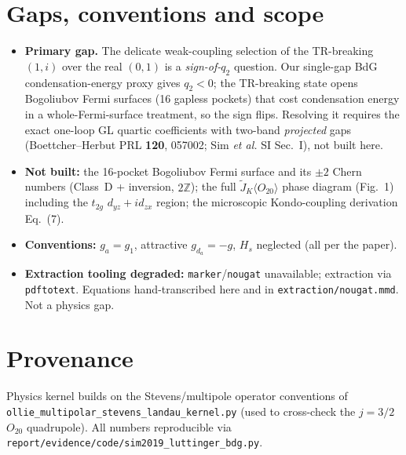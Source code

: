 \documentclass[11pt]{article}
\begin{document}
\section{Gaps, conventions and scope}
\begin{itemize}
\item \textbf{Primary gap.} The delicate weak-coupling selection of the TR-breaking $(1,i)$ over the
real $(0,1)$ is a \emph{sign-of-}$q_2$ question. Our single-gap BdG condensation-energy proxy gives
$q_2<0$; the TR-breaking state opens Bogoliubov Fermi surfaces (16 gapless pockets) that cost
condensation energy in a whole-Fermi-surface treatment, so the sign flips. Resolving it requires the
exact one-loop GL quartic coefficients with two-band \emph{projected} gaps (Boettcher--Herbut PRL
\textbf{120}, 057002; Sim \emph{et al.} SI Sec.~I), not built here.
\item \textbf{Not built:} the 16-pocket Bogoliubov Fermi surface and its $\pm2$ Chern numbers
(Class~D + inversion, $2\mathbb{Z}$); the full $\tilde J_K\langle O_{20}\rangle$ phase diagram
(Fig.~1) including the $t_{2g}$ $d_{yz}+id_{zx}$ region; the microscopic Kondo-coupling derivation Eq.~(7).
\item \textbf{Conventions:} $g_a=g_1$, attractive $g_{d_a}=-g$, $H_s$ neglected (all per the paper).
\item \textbf{Extraction tooling degraded:} \texttt{marker}/\texttt{nougat} unavailable; extraction via
\texttt{pdftotext}. Equations hand-transcribed here and in \texttt{extraction/nougat.mmd}. Not a physics gap.
\end{itemize}

\section*{Provenance}
Physics kernel builds on the Stevens/multipole operator conventions of
\texttt{ollie\_multipolar\_stevens\_landau\_kernel.py} (used to cross-check the $j=3/2$ $O_{20}$
quadrupole). All numbers reproducible via \texttt{report/evidence/code/sim2019\_luttinger\_bdg.py}.
\end{document}
